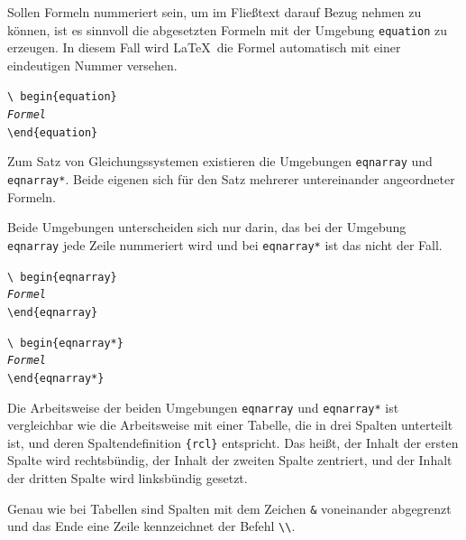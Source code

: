 \documentclass[a4paper,10pt,twoside]{scrbook}
\begin{document}
Sollen Formeln nummeriert sein, um im Fließtext darauf Bezug nehmen zu können, 
ist es sinnvoll die abgesetzten Formeln mit der Umgebung
\verb!equation! zu erzeugen. In diesem Fall wird \LaTeX\ die Formel automatisch mit einer 
eindeutigen Nummer versehen.


\begin{boxedminipage}{\textwidth}
\texttt{\textbackslash
begin\{equation\} \\
\textsl{Formel} \\
\textbackslash end\{equation\}}
\end{boxedminipage}


Zum Satz von Gleichungssystemen 
existieren die Umgebungen \verb!eqnarray! und \verb!eqnarray*!.
Beide eigenen sich für den Satz mehrerer  untereinander angeordneter Formeln.

Beide Umgebungen unterscheiden sich nur darin, das bei der Umgebung \verb!eqnarray!
jede Zeile nummeriert wird und bei \verb!eqnarray*! ist das nicht der Fall.

\begin{boxedminipage}{\textwidth}
\texttt{\textbackslash
begin\{eqnarray\} \\
\textsl{Formel} \\
\textbackslash end\{eqnarray\}}
\end{boxedminipage}

\begin{boxedminipage}{\textwidth}
\texttt{\textbackslash
begin\{eqnarray*\} \\
\textsl{Formel} \\
\textbackslash end\{eqnarray*\}}
\end{boxedminipage}


Die Arbeitsweise der beiden Umgebungen 
\verb!eqnarray! und 
\verb!eqnarray*!
ist vergleichbar wie die Arbeitsweise mit einer Tabelle, die in drei Spalten
unterteilt ist, und deren 
Spaltendefinition \verb!{rcl}! entspricht. 
Das heißt, der Inhalt der ersten Spalte wird rechtsbündig, der Inhalt der 
zweiten Spalte zentriert, und der Inhalt der dritten Spalte wird linksbündig gesetzt. 

Genau wie bei Tabellen sind Spalten mit dem Zeichen \verb!&! voneinander abgegrenzt
und das Ende eine Zeile kennzeichnet der Befehl \verb!\\!.
\end{document}
